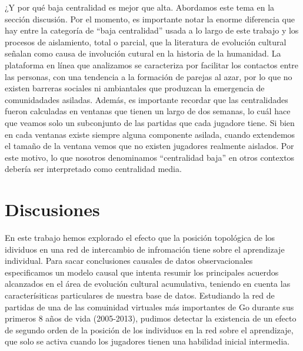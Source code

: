 \documentclass[a4paper,11pt]{book}
\theoremstyle{definition}
\begin{document}
¿Y por qué baja centralidad es mejor que alta.
%
Abordamos este tema en la sección discusión.
%
Por el momento, es importante notar la enorme diferencia que hay entre la categoría de ``baja centralidad'' usada a lo largo de este trabajo y los procesos de aislamiento, total o parcial, que la literatura de evolución cultural señalan como causa de involución cutural en la historia de la humanidad.
%
La plataforma en línea que analizamos se caracteriza por facilitar los contactos entre las personas, con una tendencia a la formación de parejas al azar, por lo que no existen barreras sociales ni ambiantales que produzcan la emergencia de comunidadades asiladas.
%
Además, es importante recordar que las centralidades fueron calculadas en ventanas que tienen un largo de dos semanas, lo cuál hace que veamos solo un subconjunto de las partidas que cada jugadore tiene.
%
Si bien en cada ventanas existe siempre alguna componente asilada, cuando extendemos el tamaño de la ventana vemos que no existen jugadores realmente aislados.
%
Por este motivo, lo que nosotros denominamos ``centralidad baja'' en otros contextos debería ser interpretado como centralidad media.
%
%
%
\section{Discusiones}

En este trabajo hemos explorado el efecto que la posición topológica de los idividuos en una red de intercambio de infromación tiene sobre el aprendizaje individual.
%
Para sacar conclusiones causales de datos observacionales especificamos un modelo causal que intenta resumir los principales acuerdos alcanzados en el área de evolución cultural acumulativa, teniendo en cuenta las caracterísiticas particulares de nuestra base de datos.
%
Estudiando la red de partidas de una de las comuinidad virtuales más importantes de Go durante sus primeros 8 años de vida (2005-2013), pudimos detectar la existencia de un efecto de segundo orden de la posición de los individuos en la red sobre el aprendizaje, que solo se activa cuando los jugadores tienen una habilidad inicial intermedia.
\end{document}
